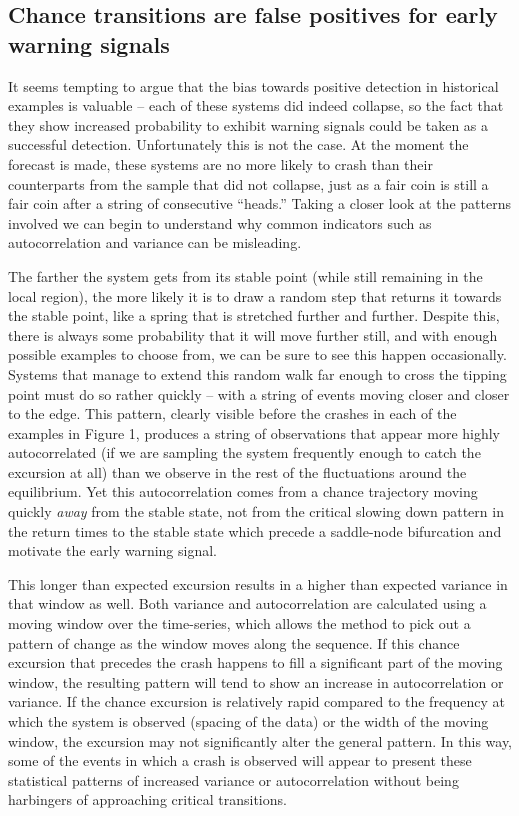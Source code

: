 \documentclass[authoryear,review,12pt]{elsarticle}
\begin{document}
\subsection{Chance transitions are false positives for early warning signals}

It seems tempting to argue that the bias towards positive detection
in historical examples is valuable -- each of these systems did
indeed collapse, so the fact that they show increased probability
to exhibit warning signals could be taken as a successful detection.
Unfortunately this is not the case. At the moment the forecast is made,
these systems are no more likely to crash than their counterparts from
the sample that did not collapse, just as a fair coin is still a fair
coin after a string of consecutive ``heads.''  Taking a closer look at
the patterns involved we can begin to understand why common indicators
such as autocorrelation and variance can be misleading.

The farther the system gets from its stable point (while still remaining
in the local region), the more likely it is to draw a random step that
returns it towards the stable point, like a spring that is stretched
further and further. Despite this, there is always some probability that
it will move further still, and with enough possible examples to choose
from, we can be sure to see this happen occasionally.  Systems that manage
to extend this random walk far enough to cross the tipping point must do
so rather quickly -- with a string of events moving closer and closer to
the edge.  This pattern, clearly visible before the crashes in each of
the examples in Figure 1, produces a string of observations that appear
more highly autocorrelated (if we are sampling the system frequently
enough to catch the excursion at all) than we observe in the rest of the
fluctuations around the equilibrium.  Yet this autocorrelation comes from
a chance trajectory moving quickly \emph{away} from the stable state,
not from the critical slowing down pattern in the return times to the
stable state which precede a saddle-node bifurcation and motivate the
early warning signal.


This longer than expected excursion results in a higher than expected
variance in that window as well. Both variance and autocorrelation are
calculated using a moving window over the time-series, which allows
the method to pick out a pattern of change as the window moves along
the sequence. If this chance excursion that precedes the crash happens
to fill a significant part of the moving window, the resulting pattern
will tend to show an increase in autocorrelation or variance.  If the
chance excursion is relatively rapid compared to the frequency at which
the system is observed (spacing of the data) or the width of the moving
window, the excursion may not significantly alter the general pattern.
In this way, some of the events in which a crash is observed will
appear to present these statistical patterns of increased variance
or autocorrelation without being harbingers of approaching critical
transitions.
\end{document}
